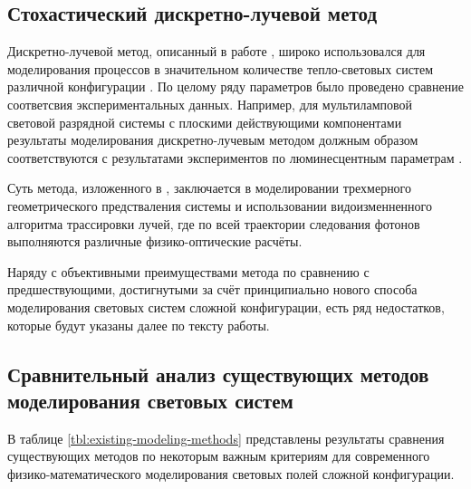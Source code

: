 \subsection{Стохастический дискретно-лучевой метод}

Дискретно-лучевой метод, описанный в работе \cite{gradov-dissertation}, широко использовался для моделирования процессов в значительном количестве тепло-световых систем различной конфигурации \cite{gradov-machine-modeling}.
По целому ряду параметров было проведено сравнение соответсвия экспериментальных данных.
Например, для мультиламповой световой разрядной системы с плоскими действующими компонентами результаты моделирования дискретно-лучевым методом должным образом соответствуются с результатами экспериментов по люминесцентным пара­метрам \cite{gradov-calculation-methods, gradov-machine-modeling}.

Суть метода, изложенного в \cite{gradov-dissertation}, заключается в моделировании трехмерного геометрического предстваления системы и использовании видоизменненного алгоритма трассировки лучей, где по всей траектории следования фотонов выполняются различные физико-оптические расчёты.

Наряду с объективными преимуществами метода по сравнению с предшествующими, достигнутыми за счёт принципиально нового способа моделирования световых систем сложной конфигурации, есть ряд недостатков, которые будут указаны далее по тексту работы.

\subsection{Сравнительный анализ существующих методов моделирования световых систем}

В таблице \ref{tbl:existing-modeling-methods} представлены результаты сравнения существующих методов по некоторым важным критериям для современного физико-математического моделирования световых полей сложной конфигурации.

